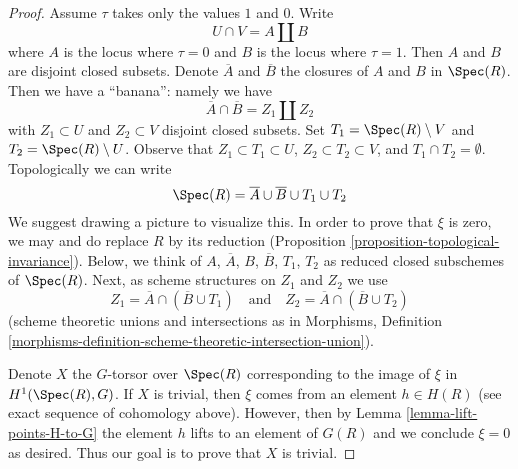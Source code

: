 \begin{proof}
\medskip\noindent
Assume $\tau$ takes only the values $1$ and $0$. Write
$$
U \cap V = A \amalg B
$$
where $A$ is the locus where $\tau = 0$ and $B$ is the locus
where $\tau = 1$. Then $A$ and $B$ are disjoint closed subsets.
Denote $\overline{A}$ and $\overline{B}$ the closures of $A$ and $B$ in
$\Spec(R)$. Then we have a ``banana'': namely
we have
$$
\overline{A} \cap \overline{B} = Z_1 \amalg Z_2
$$
with $Z_1 \subset U$ and $Z_2 \subset V$ disjoint closed subsets.
Set $T_1 = \Spec(R) \setminus V$ and $T_2 = \Spec(R) \setminus U$.
Observe that $Z_1 \subset T_1 \subset U$, $Z_2 \subset T_2 \subset V$, and
$T_1 \cap T_2 = \emptyset$. Topologically we can write
$$
\Spec(R) = \overline{A} \cup \overline{B} \cup T_1 \cup T_2
$$
We suggest drawing a picture to visualize this.
In order to prove that $\xi$ is zero, we may and do replace $R$ by
its reduction (Proposition \ref{proposition-topological-invariance}).
Below, we think of $A$, $\overline{A}$, $B$, $\overline{B}$, $T_1$, $T_2$
as reduced closed subschemes of $\Spec(R)$. Next, as scheme structures on $Z_1$
and $Z_2$ we use
$$
Z_1 = \overline{A} \cap (\overline{B} \cup T_1)
\quad\text{and}\quad
Z_2 = \overline{A} \cap (\overline{B} \cup T_2)
$$
(scheme theoretic unions and intersections as in Morphisms, Definition
\ref{morphisms-definition-scheme-theoretic-intersection-union}).

\medskip\noindent
Denote $X$ the $G$-torsor over $\Spec(R)$ corresponding to the image
of $\xi$ in $H^1(\Spec(R), G)$. If $X$ is trivial, then $\xi$
comes from an element $h \in H(R)$ (see exact sequence of cohomology
above). However, then by Lemma \ref{lemma-lift-points-H-to-G}
the element $h$ lifts to an element of $G(R)$ and we conclude
$\xi = 0$ as desired. Thus our goal is to prove that $X$ is trivial.


\end{proof}
